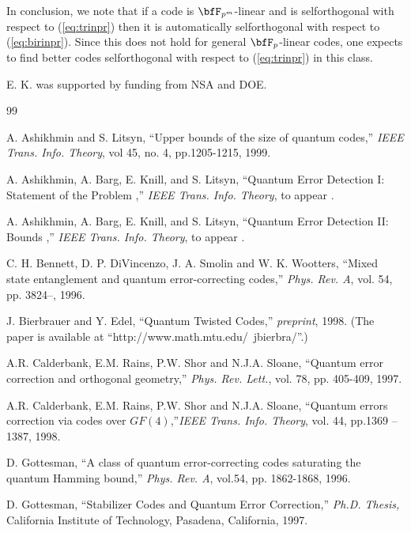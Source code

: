 \documentclass{article}
\begin{document}
In conclusion, we
note that if a code is $\bfF_{p^{m}}$-linear and is
selforthogonal with respect to (\ref{eq:trinpr}) then it is
automatically selforthogonal with respect to (\ref{eq:birinpr}).
Since this does not hold for general $\bfF_p$-linear codes, one
expects to find better codes selforthogonal with respect to
(\ref{eq:trinpr}) in this class.

E. K. was supported by funding from NSA and DOE.
 
\begin{thebibliography}{99}
 

 A. Ashikhmin and  S. Litsyn, ``Upper bounds of the 
size of quantum codes,'' {\it IEEE Trans. Info. Theory}, vol 45, 
no. 4, pp.1205-1215, 1999.

 A. Ashikhmin, A. Barg, E. Knill,  and  S. Litsyn,
``Quantum Error Detection I: Statement of the Problem ,'' {\it IEEE
Trans. Info. Theory}, to appear .


 A. Ashikhmin, A. Barg, E. Knill,  and  S. Litsyn,
``Quantum Error Detection II: Bounds ,'' {\it IEEE
Trans. Info. Theory}, to appear .

C. H. Bennett, D. P. DiVincenzo, J. A. Smolin and W. K. Wootters,
``Mixed state entanglement and quantum error-correcting codes,''
{\em Phys. Rev. A}, vol. 54, pp. 3824--, 1996.

 J. Bierbrauer and Y. Edel, ``Quantum Twisted
Codes,'' {\em preprint}, 1998. (The paper is available at
``http://www.math.mtu.edu/~jbierbra/''.)

 A.R. Calderbank, E.M. Rains, P.W. Shor and N.J.A. Sloane,  
 ``Quantum error correction and orthogonal geometry,'' 
 {\em Phys. Rev. Lett.}, vol. 78, pp. 405-409, 1997. 

 A.R. Calderbank, E.M. Rains, P.W. Shor and N.J.A. Sloane, ``Quantum errors 
correction via codes 
over $GF(4)$,''{\it IEEE Trans. Info. Theory}, vol. 44, pp.1369
--1387, 1998. 


 D. Gottesman, ``A class of quantum 
error-correcting codes saturating the quantum Hamming bound,'' 
{\em  Phys. Rev. A}, vol.54, pp. 1862-1868, 1996. 

 D. Gottesman, ``Stabilizer Codes and Quantum
Error Correction,'' {\em Ph.D. Thesis,} California Institute of
Technology,
Pasadena, California, 1997.  


\end{thebibliography}
\end{document}
